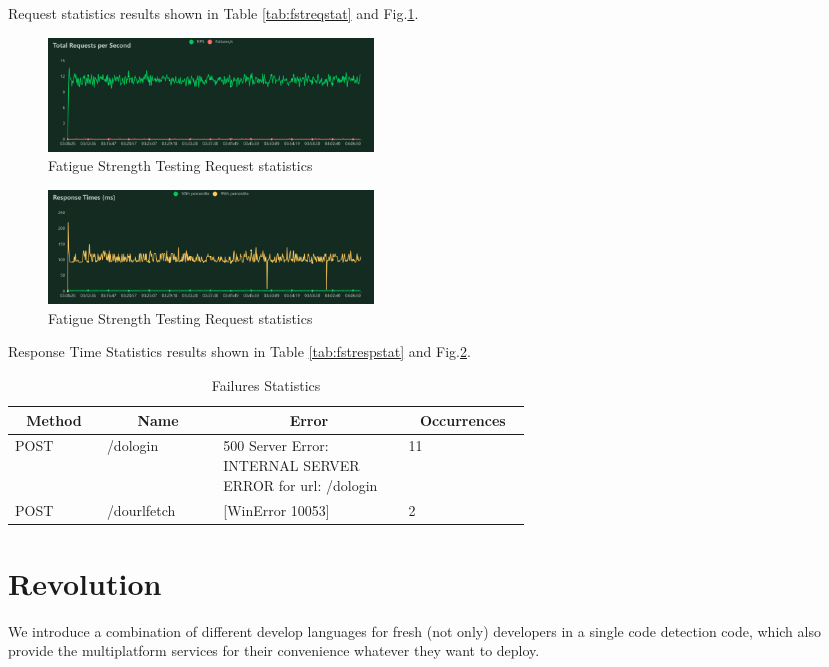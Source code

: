 \documentclass[journal]{IEEEtran}
\begin{document}
Request statistics results shown in Table \ref{tab:fstreqstat} and Fig.\ref{fig:fstreqstat}.

\begin{figure}[h]
  \centering
  \includegraphics[width=3.4in]{figures/fstreqstat.png}
  \caption{Fatigue Strength Testing Request statistics}
  \label{fig:fstreqstat}
  \end{figure}
\begin{figure}[h]
  \centering
  \includegraphics[width=3.4in]{figures/fstrespstat.png}
  \caption{Fatigue Strength Testing Request statistics}
  \label{fig:fstrespstat}
  \end{figure}

Response Time Statistics results shown in Table \ref{tab:fstrespstat} and Fig.\ref{fig:fstrespstat}.

\begin{table}[h]
\caption{Failures Statistics}
\label{tab:failureseva}
\begin{tabular}{|p{0.1\linewidth}|p{0.15\linewidth}|p{0.25\linewidth}|p{0.1\linewidth}|}
\hline
\multicolumn{1}{|c|}{\textbf{Method}} & \multicolumn{1}{c|}{\textbf{Name}} & \multicolumn{1}{c|}{\textbf{Error}}                       & \multicolumn{1}{c|}{\textbf{Occurrences}} \\ \hline
POST                                  & /dologin                           & 500 Server Error: INTERNAL SERVER ERROR for url: /dologin & 11                                        \\ \hline
POST                                  & /dourlfetch                        & {[}WinError 10053{]}                 & 2                                         \\ \hline
\end{tabular}
\end{table}

\section{Revolution}
We introduce a combination of different develop languages for fresh (not only) developers in a single code detection code, which also provide the multiplatform services for their convenience whatever they want to deploy.
\end{document}
